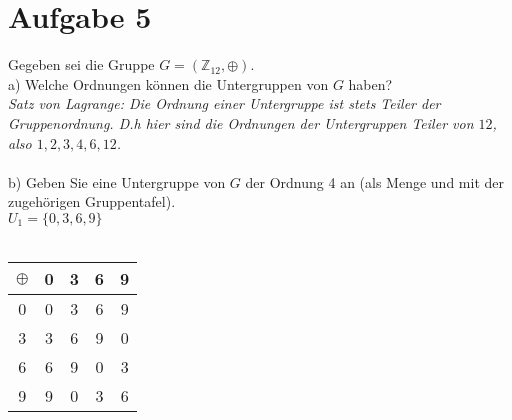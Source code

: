 \section*{Aufgabe 5}

Gegeben sei die Gruppe $G = (\mathbb{Z}_{12}, \oplus)$.\\

a) Welche Ordnungen können die Untergruppen von $G$ haben?\\

\textit{Satz von Lagrange: Die Ordnung einer Untergruppe ist stets Teiler der Gruppenordnung. D.h hier sind die Ordnungen der Untergruppen Teiler von $12$, also $1, 2, 3, 4, 6, 12$.}\\~\\

b) Geben Sie eine Untergruppe von $G$ der Ordnung 4 an (als Menge und mit der zugehörigen Gruppentafel).\\

$U_1 = \{0,3,6,9\}$\\~\\
\begin{tabular}{c|cccc}
$\oplus$ & 0 & 3 & 6 & 9\\
\hline
0 & 0 & 3 & 6 & 9\\
3 & 3 & 6 & 9 & 0\\
6 & 6 & 9 & 0 & 3\\
9 & 9 & 0 & 3 & 6\\
\end{tabular}

\newpage
